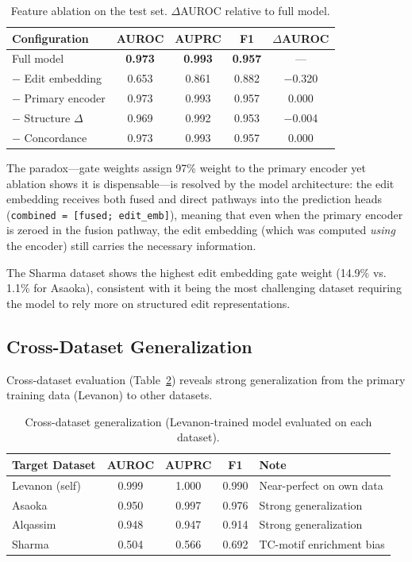 \documentclass[11pt]{article}
\newcommand{\best}[1]{\textbf{\textcolor{best}{#1}}}
\begin{document}
\begin{table}[htb]
\centering
\caption{Feature ablation on the test set. $\Delta$AUROC relative to full model.}
\label{tab:ablation}
\begin{tabular}{@{}lcccc@{}}
\toprule
\textbf{Configuration} & \textbf{AUROC} & \textbf{AUPRC} & \textbf{F1} &
\textbf{$\Delta$AUROC} \\
\midrule
Full model & \best{0.973} & \best{0.993} & \best{0.957} & --- \\
$-$ Edit embedding & 0.653 & 0.861 & 0.882 & $-$0.320 \\
$-$ Primary encoder & 0.973 & 0.993 & 0.957 & 0.000 \\
$-$ Structure $\Delta$ & 0.969 & 0.992 & 0.953 & $-$0.004 \\
$-$ Concordance & 0.973 & 0.993 & 0.957 & 0.000 \\
\bottomrule
\end{tabular}
\end{table}

The paradox---gate weights assign 97\% weight to the primary encoder yet ablation
shows it is dispensable---is resolved by the model architecture: the edit
embedding receives both fused and direct pathways into the prediction heads
(\texttt{combined = [fused; edit\_emb]}), meaning that even when the primary
encoder is zeroed in the fusion pathway, the edit embedding (which was computed
\emph{using} the encoder) still carries the necessary information.

The Sharma dataset shows the highest edit embedding gate weight (14.9\% vs.
1.1\% for Asaoka), consistent with it being the most challenging dataset
requiring the model to rely more on structured edit representations.

\subsection{Cross-Dataset Generalization}

Cross-dataset evaluation (Table~\ref{tab:cross_dataset}) reveals strong
generalization from the primary training data (Levanon) to other datasets.

\begin{table}[htb]
\centering
\caption{Cross-dataset generalization (Levanon-trained model evaluated on each dataset).}
\label{tab:cross_dataset}
\begin{tabular}{@{}lcccl@{}}
\toprule
\textbf{Target Dataset} & \textbf{AUROC} & \textbf{AUPRC} & \textbf{F1} & \textbf{Note} \\
\midrule
Levanon (self) & 0.999 & 1.000 & 0.990 & Near-perfect on own data \\
Asaoka & 0.950 & 0.997 & 0.976 & Strong generalization \\
Alqassim & 0.948 & 0.947 & 0.914 & Strong generalization \\
Sharma & 0.504 & 0.566 & 0.692 & TC-motif enrichment bias \\
\bottomrule
\end{tabular}
\end{table}
\end{document}
